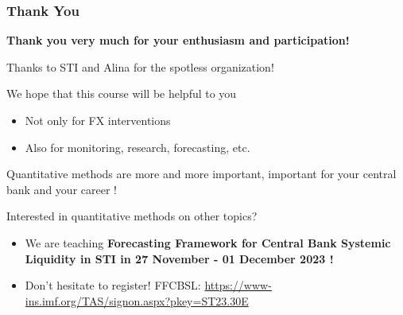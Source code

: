 \documentclass{beamer}
\newenvironment{wideitemize}{\itemize\addtolength{\itemsep}{10pt}}{\enditemize}
\begin{document}
\begin{frame}
  \frametitle{Thank You}
  \begin{wideitemize}
  \item \textbf{Thank you very much for your enthusiasm and participation!}
  \item Thanks to STI and Alina for the spotless organization!
  \item We hope that this course will be helpful to you
    \begin{itemize}
    \item Not only for FX interventions
    \item Also for monitoring, research, forecasting, etc.
    \end{itemize}
  \item Quantitative methods are more and more important, important for your central bank and your career !
  \item Interested in quantitative methods on other topics?
    \begin{itemize}
    \item We are teaching \textbf{Forecasting Framework for Central Bank Systemic Liquidity in STI in 27 November - 01 December 2023 !}
    \item Don't hesitate to register! FFCBSL: \href{https://www-ins.imf.org/TAS/signon.aspx?pkey=ST23.30E}{https://www-ins.imf.org/TAS/signon.aspx?pkey=ST23.30E}
    \end{itemize}
  \end{wideitemize}
\end{frame}




\end{document}
